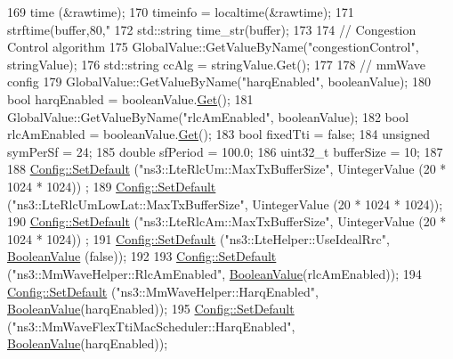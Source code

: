 \begin{DoxyCode}
{{169   time (&rawtime);
170   timeinfo = localtime(&rawtime);
171   strftime(buffer,80,\textcolor{stringliteral}{"%
172   std::string time\_str(buffer);
173 
174   \textcolor{comment}{// Congestion Control algorithm}
175   GlobalValue::GetValueByName(\textcolor{stringliteral}{"congestionControl"}, stringValue);
176   std::string ccAlg = stringValue.Get();
177 
178   \textcolor{comment}{// mmWave config}
179   GlobalValue::GetValueByName(\textcolor{stringliteral}{"harqEnabled"}, booleanValue);
180   \textcolor{keywordtype}{bool} harqEnabled = booleanValue.\hyperlink{classns3_1_1BooleanValue_a15d5d96abfd11676964f40859442ec12}{Get}();
181   GlobalValue::GetValueByName(\textcolor{stringliteral}{"rlcAmEnabled"}, booleanValue);
182   \textcolor{keywordtype}{bool} rlcAmEnabled = booleanValue.\hyperlink{classns3_1_1BooleanValue_a15d5d96abfd11676964f40859442ec12}{Get}();
183   \textcolor{keywordtype}{bool} fixedTti = \textcolor{keyword}{false};
184   \textcolor{keywordtype}{unsigned} symPerSf = 24;
185   \textcolor{keywordtype}{double} sfPeriod = 100.0;
186   uint32\_t bufferSize = 10; 
187 
188   \hyperlink{group__config_ga2e7882df849d8ba4aaad31c934c40c06}{Config::SetDefault} (\textcolor{stringliteral}{"ns3::LteRlcUm::MaxTxBufferSize"}, UintegerValue (20 * 1024 * 1024))
      ;
189   \hyperlink{group__config_ga2e7882df849d8ba4aaad31c934c40c06}{Config::SetDefault} (\textcolor{stringliteral}{"ns3::LteRlcUmLowLat::MaxTxBufferSize"}, UintegerValue (20 * 1024 * 
      1024));
190   \hyperlink{group__config_ga2e7882df849d8ba4aaad31c934c40c06}{Config::SetDefault} (\textcolor{stringliteral}{"ns3::LteRlcAm::MaxTxBufferSize"}, UintegerValue (20 * 1024 * 1024))
      ;
191   \hyperlink{group__config_ga2e7882df849d8ba4aaad31c934c40c06}{Config::SetDefault} (\textcolor{stringliteral}{"ns3::LteHelper::UseIdealRrc"}, 
      \hyperlink{classns3_1_1BooleanValue}{BooleanValue} (\textcolor{keyword}{false}));
192 
193   \hyperlink{group__config_ga2e7882df849d8ba4aaad31c934c40c06}{Config::SetDefault} (\textcolor{stringliteral}{"ns3::MmWaveHelper::RlcAmEnabled"}, 
      \hyperlink{classns3_1_1BooleanValue}{BooleanValue}(rlcAmEnabled));
194   \hyperlink{group__config_ga2e7882df849d8ba4aaad31c934c40c06}{Config::SetDefault} (\textcolor{stringliteral}{"ns3::MmWaveHelper::HarqEnabled"}, 
      \hyperlink{classns3_1_1BooleanValue}{BooleanValue}(harqEnabled));
195   \hyperlink{group__config_ga2e7882df849d8ba4aaad31c934c40c06}{Config::SetDefault} (\textcolor{stringliteral}{"ns3::MmWaveFlexTtiMacScheduler::HarqEnabled"}, 
      \hyperlink{classns3_1_1BooleanValue}{BooleanValue}(harqEnabled));
}}}
\end{DoxyCode}
